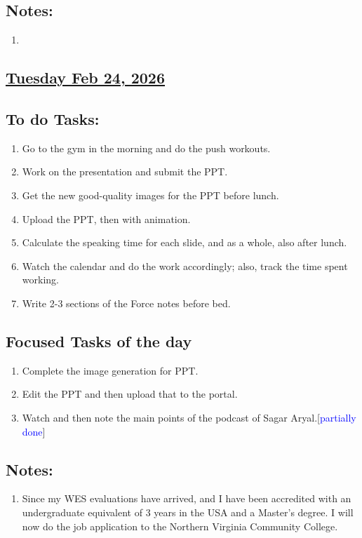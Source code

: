 \subsection*{Notes:}
\begin{enumerate}
    \item 
\end{enumerate}
\subsection*{\underline{Tuesday Feb 24, 2026}}
\subsection*{To do Tasks:}
\begin{enumerate}
    \item Go to the gym in the morning and do the push workouts. \cmark
    \item Work on the presentation and submit the PPT. \cmark  
    \item Get the new good-quality images for the PPT before lunch. \cmark
    \item Upload the PPT, then with animation.\cmark
    \item Calculate the speaking time for each slide, and as a whole, also after lunch. \xmark
    \item Watch the calendar and do the work accordingly; also, track the time spent working. \cmark
    \item Write 2-3 sections of the Force notes before bed.\xmark
\end{enumerate}
\subsection*{Focused Tasks of the day}
\begin{enumerate}[\ding{212}]  %
    \item Complete the image generation for PPT.\cmark
    \item Edit the PPT and then upload that to the portal.\cmark
    \item Watch and then note the main points of the podcast of Sagar Aryal.[\textcolor{blue}{partially done}] \cmark 
\end{enumerate}
\subsection*{Notes:}
\begin{enumerate}
    \item Since my WES evaluations have arrived, and I have been accredited with an undergraduate equivalent of 3 years in the USA and a Master's degree. I will now do the job application to the Northern Virginia Community College.
\end{enumerate}
